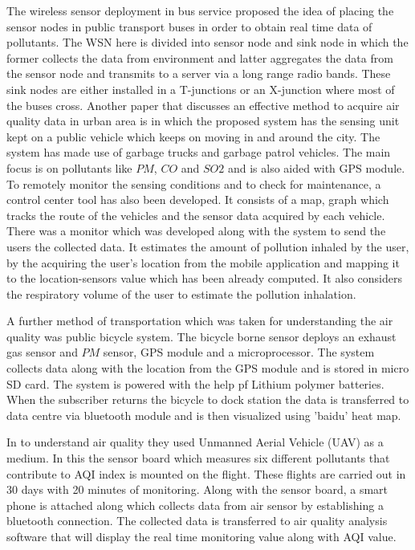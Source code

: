 The wireless sensor deployment in bus service \cite{Saha2017} proposed the idea of placing the sensor nodes in public transport buses in order to obtain real time data of pollutants. The WSN here is divided into sensor node and sink node in which the former collects the data from environment and latter aggregates the data from the sensor node and transmits to a server via a long range radio bands. These sink nodes are either installed in a T-junctions or an X-junction where most of the buses cross.
Another paper that  discusses an effective method to acquire air quality data in urban area is \cite {Shirai2016} in which the proposed system has the sensing unit kept on a public vehicle which keeps on moving in and around the city. The system has made use of garbage trucks and garbage patrol vehicles. The main focus is on pollutants like $PM$, $CO$ and $SO2$ and is also aided with GPS module. To remotely monitor the sensing conditions and to check for maintenance, a control center tool has also been developed. It consists of a map, graph which tracks the route of the vehicles and the sensor data acquired by each vehicle. There was a  monitor which was developed along with the system to send the users the collected data. It estimates the amount of pollution inhaled by the user, by the acquiring the user's location from the mobile application and mapping it to the location-sensors value which has been already computed. It also considers the respiratory volume of the user to estimate the pollution inhalation.

A further method of transportation which was taken for understanding the air quality was public bicycle system. The bicycle borne sensor \cite{Xiang2016,Liu2015a} deploys an exhaust gas sensor and $PM$ sensor, GPS module and a microprocessor. The system collects data along with the location from the GPS module and is stored in micro SD card. The system is powered with the help pf Lithium polymer batteries. When the subscriber returns the bicycle to dock station the data is transferred to data centre via bluetooth module and is then visualized using 'baidu' heat map. 

In \cite{Zhi2017} to understand air quality they used Unmanned Aerial Vehicle (UAV) as a medium.  In this the sensor board which measures six different pollutants that contribute to AQI index is mounted on the flight.  These flights are carried out in 30 days with 20 minutes of monitoring. Along with the sensor board, a smart phone is attached along which collects data from air sensor by establishing a bluetooth connection. The collected data is transferred to air quality analysis software that will display the real time monitoring value along with AQI value.

